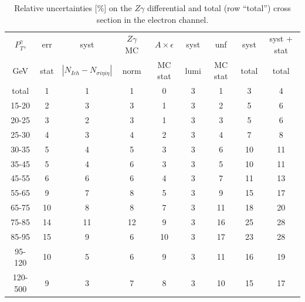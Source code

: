 \begin{table}[h]
  \scriptsize
  \begin{center}
  \caption{Relative uncertainties [\%] on the $Z\gamma$ differential and total (row ``total'') cross section in the electron channel.}
  \begin{tabular}{|c|c|c|c|c|c|c|c|c|}
    $P_T^{\gamma}$,  & err & syst & $Z\gamma$ MC & $A\times \epsilon$ & syst & unf & syst & syst + stat\\
    GeV  & stat & $|N_{Ich}-N_{\sigma{i\eta i\eta}}|$ & norm & MC stat & lumi & MC stat & total & total\\ \hline
    total  & 1 & 1 & 1 & 0 & 3 & 1 & 3 & 4 \\ \hline
    15-20 & 2 & 3 & 3 & 1 & 3 & 2 & 5 & 6 \\ \hline
    20-25 & 3 & 2 & 3 & 1 & 3 & 3 & 5 & 6 \\ \hline
    25-30 & 4 & 3 & 4 & 2 & 3 & 4 & 7 & 8 \\ \hline
    30-35 & 5 & 4 & 5 & 3 & 3 & 6 & 10 & 11 \\ \hline
    35-45 & 5 & 4 & 6 & 3 & 3 & 5 & 10 & 11 \\ \hline
    45-55 & 6 & 6 & 6 & 4 & 3 & 7 & 11 & 13 \\ \hline
    55-65 & 9 & 7 & 8 & 5 & 3 & 9 & 15 & 17 \\ \hline
    65-75 & 10 & 8 & 8 & 7 & 3 & 11 & 18 & 20 \\ \hline
    75-85 & 14 & 11 & 12 & 9 & 3 & 16 & 25 & 28 \\ \hline
    85-95 & 15 & 9 & 6 & 10 & 3 & 17 & 23 & 28 \\ \hline
    95-120 & 10 & 5 & 6 & 9 & 3 & 11 & 16 & 19 \\ \hline
    120-500 & 9 & 3 & 7 & 8 & 3 & 10 & 15 & 17 \\ \hline
  \end{tabular}
  \label{tab:systInPercent_ELECTRON_ZGamma}
  \end{center}
\end{table}

